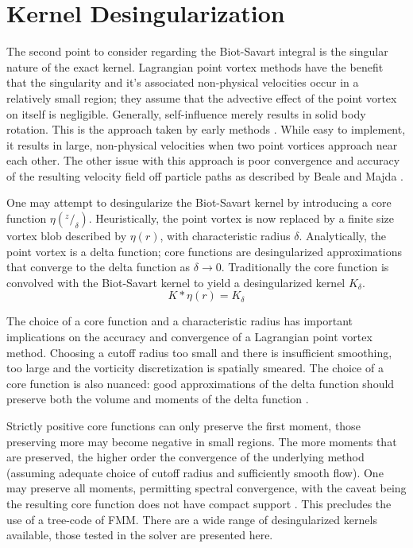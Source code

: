 \documentclass[letterpaper,12pt]{report}
\newcommand{\ben}[1]{\begin{equation}\label{#1}}
\newcommand{\ee}{\end{equation}}
\begin{document}
\section{Kernel Desingularization} 
The second point to consider regarding the Biot-Savart integral is the singular nature of the exact kernel. Lagrangian point vortex methods have the benefit that the singularity and it's associated non-physical velocities occur in a relatively small region; they assume that the advective effect of the point vortex on itself is negligible. Generally, self-influence merely results in solid body rotation. This is the approach taken by early methods \cite{Point1}. While easy to implement, it results in large, non-physical velocities when two point vortices approach near each other. The other issue with this approach is poor convergence and accuracy of the resulting velocity field off particle paths as described by Beale and Majda \cite{BealeMajda}.

One may attempt to desingularize the Biot-Savart kernel  by introducing a core function $\eta(^z/_{\delta})$. Heuristically, the point vortex is now replaced by a finite size vortex blob described by $\eta(r)$, with characteristic radius $\delta$. Analytically, the point vortex is a delta function; core functions are desingularized approximations that converge to the delta function as $\delta \rightarrow 0$. Traditionally the core function is convolved with the Biot-Savart kernel to yield a desingularized kernel $K_{\delta}$.
\ben{DesingBS} K*\eta(r) = K_{\delta} \ee

The choice of a core function and a characteristic radius has important implications on the accuracy and convergence of a Lagrangian point vortex method. Choosing a cutoff radius too small and there is insufficient smoothing, too large and the vorticity discretization is spatially smeared. The choice of a core function is also nuanced: good approximations of the delta function should preserve both the volume and moments of the delta function \cite{BealeMajda}.

Strictly positive core functions can only preserve the first moment, those preserving more may become negative in small regions. The more moments that are preserved, the higher order the convergence of the underlying method (assuming adequate choice of cutoff radius and sufficiently smooth flow). One may preserve all moments, permitting spectral convergence, with the caveat being the resulting core function does not have compact support \cite{Hald3}. This precludes the use of a tree-code of FMM. There are a wide range of desingularized kernels available, those tested in the solver are presented here.
\end{document}
